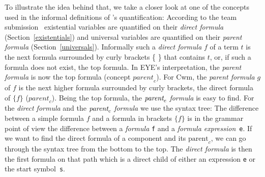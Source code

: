 To illustrate the idea behind that, we 
%
take  a closer look at one of the concepts used in the informal definitions of \nthree's quantification: %
According to the \wwwc team submission~\cite{Notation3} existential variables are quantified on their \emph{direct formula} (Section~\ref{existentials}) and 
universal variables are quantified on their \emph{parent formula} (Section~\ref{universals}). %
%
%
%
\label{parentformula}
Informally 
such a \emph{direct formula} $f$ of a term $t$ is the next formula surrounded by curly brackets \{ \} that contains $t$, or, if such a formula does not exist, 
the top formula. 
In EYE's interpretation, the \emph{parent formula} is now the top formula (concept $\textit{parent}_e$). 
For Cwm, the \emph{parent formula} $g$ of $f$ is the next higher formula surrounded by curly brackets, \ie the direct formula of $\{f\}$ ($\textit{parent}_c$). %
%
Being the top formula, the $\emph{parent}_e$ \emph{formula} is easy to find. For the \emph{direct formula} and the $\emph{parent}_c$ \emph{formula} we use the syntax tree:
The difference between a simple formula $f$ and a formula in brackets $\{f\}$ is in the grammar point of view the difference between
a \emph{formula} \texttt{f} and a \emph{formula expression}~\texttt{e}.
If we want to find the direct formula of a component and its $\text{parent}_c$, we can go through the syntax tree from the bottom to the top.  
The \emph{direct formula} is then the first formula on that path which is a direct child of either an expression \texttt{e}  or the start symbol~\texttt{s}. 
